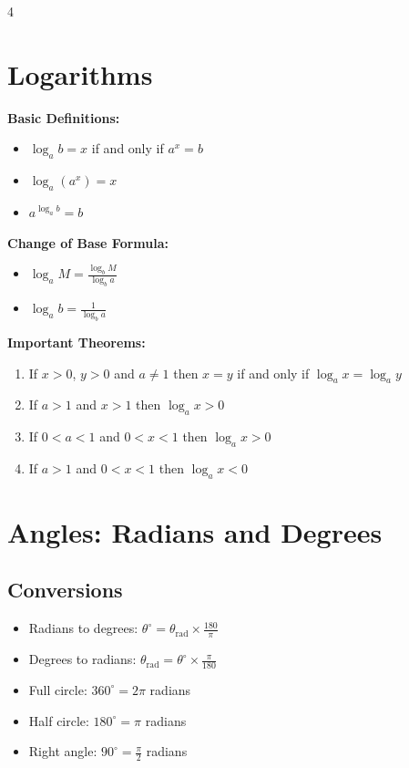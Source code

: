 \begin{multicols*}{4}
\section*{Logarithms}

\textbf{Basic Definitions:}
\begin{itemize}
    \item $\log_a b = x$ if and only if $a^x = b$
    \item $\log_a (a^x) = x$
    \item $a^{\log_a b} = b$
\end{itemize}

\textbf{Change of Base Formula:}
\begin{itemize}
    \item $\log_a M = \frac{\log_b M}{\log_b a}$
    \item $\log_a b = \frac{1}{\log_b a}$
\end{itemize}

\textbf{Important Theorems:}
\begin{enumerate}
    \item[(i)] If $x > 0$, $y > 0$ and $a \neq 1$ then $x = y$ if and only if $\log_a x = \log_a y$
    \item[(ii)] If $a > 1$ and $x > 1$ then $\log_a x > 0$
    \item[(iii)] If $0 < a < 1$ and $0 < x < 1$ then $\log_a x > 0$
    \item[(iv)] If $a > 1$ and $0 < x < 1$ then $\log_a x < 0$
\end{enumerate}








\section*{Angles: Radians and Degrees}

\subsection*{Conversions}
\begin{itemize}
    \item Radians to degrees: $\theta^\circ = \theta_{\text{rad}} \times \frac{180}{\pi}$
    \item Degrees to radians: $\theta_{\text{rad}} = \theta^\circ \times \frac{\pi}{180}$
    \item Full circle: $360^\circ = 2\pi$ radians
    \item Half circle: $180^\circ = \pi$ radians
    \item Right angle: $90^\circ = \frac{\pi}{2}$ radians
\end{itemize}


\end{multicols*}
